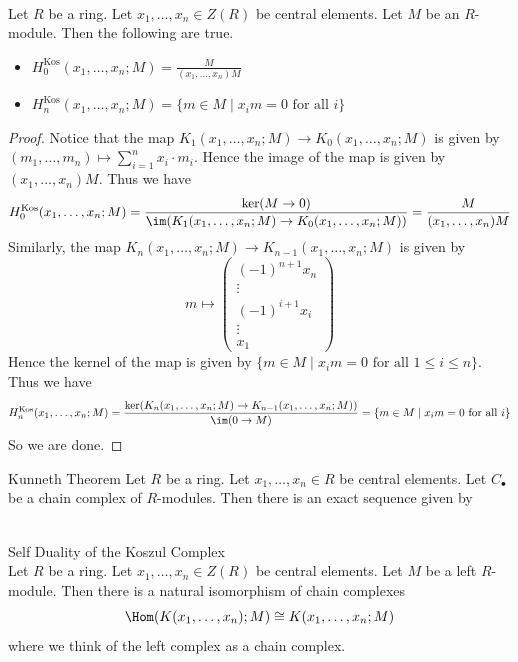 \documentclass[a4paper]{article}
\begin{document}
\begin{lmm}{}{}\\
Let $R$ be a ring. Let $x_1,\dots,x_n\in Z(R)$ be central elements. Let $M$ be an $R$-module. Then the following are true. 
\begin{itemize}
\item $H_0^\text{Kos}(x_1,\dots,x_n;M)=\frac{M}{(x_1,\dots,x_n)M}$
\item $H_n^\text{Kos}(x_1,\dots,x_n;M)=\{m\in M\;|\;x_im=0\text{ for all }i\}$
\end{itemize}
\begin{proof}
Notice that the map $K_1(x_1,\dots,x_n;M)\to K_0(x_1,\dots,x_n;M)$ is given by $(m_1,\dots,m_n)\mapsto\sum_{i=1}^nx_i\cdot m_i$. Hence the image of the map is given by $(x_1,\dots,x_n)M$. Thus we have $$H_0^\text{Kos}(x_1,\dots,x_n;M)=\frac{\ker(M\to 0)}{\im(K_1(x_1,\dots,x_n;M)\to K_0(x_1,\dots,x_n;M))}=\frac{M}{(x_1,\dots,x_n)M}$$ Similarly, the map $K_n(x_1,\dots,x_n;M)\to K_{n-1}(x_1,\dots,x_n;M)$ is given by $$m\mapsto\begin{pmatrix}
(-1)^{n+1}x_n\\
\vdots\\
(-1)^{i+1}x_i\\
\vdots\\
x_1
\end{pmatrix}$$ Hence the kernel of the map is given by $\{m\in M\;|\;x_im=0\text{ for all }1\leq i\leq n\}$. Thus we have $$H_n^\text{Kos}(x_1,\dots,x_n;M)=\frac{\ker(K_n(x_1,\dots,x_n;M)\to K_{n-1}(x_1,\dots,x_n;M))}{\im(0\to M)}=\{m\in M\;|\;x_im=0\text{ for all }i\}$$ So we are done. 
\end{proof}
\end{lmm}

\begin{thm}{Kunneth Theorem}{} Let $R$ be a ring. Let $x_1,\dots,x_n\in R$ be central elements. Let $C_\bullet$ be a chain complex of $R$-modules. Then there is an exact sequence given by \\~\\
\end{thm}

\begin{thm}{Self Duality of the Koszul Complex}{}\\
Let $R$ be a ring. Let $x_1,\dots,x_n\in Z(R)$ be central elements. Let $M$ be a left $R$-module. Then there is a natural isomorphism of chain complexes $$\Hom(K(x_1,\dots,x_n);M)\cong K(x_1,\dots,x_n;M)$$ where we think of the left complex as a chain complex. 
\end{thm}
\end{document}
